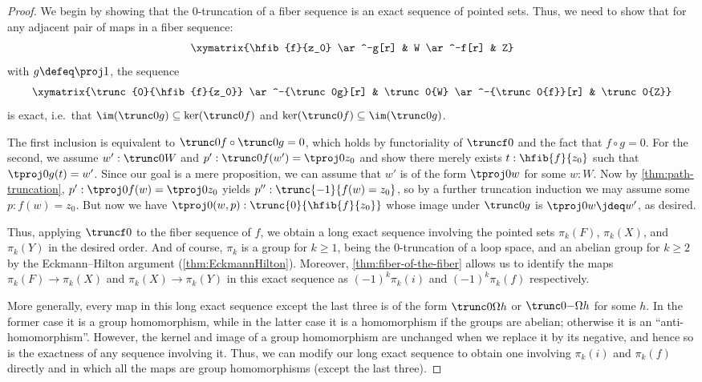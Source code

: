 \begin{proof}
  We begin by showing that the 0-truncation of a fiber sequence is an exact sequence of pointed sets.
  Thus, we need to show that for any adjacent pair of maps in a fiber sequence:
  \[\xymatrix{\hfib{f}{z_0} \ar^-g[r] & W \ar^-f[r] & Z}\]
  with $g\defeq \proj1$, the sequence
  \[\xymatrix{\trunc{0}{\hfib{f}{z_0}} \ar^-{\trunc0g}[r] & \trunc0{W}
    \ar^-{\trunc0{f}}[r] & \trunc0{Z}}\]
  is exact, i.e.\ that $\im(\trunc0g)\subseteq\ker(\trunc0f)$ and $\ker(\trunc0f)\subseteq\im(\trunc0g)$.

  The first inclusion is equivalent to $\trunc0f\circ\trunc0g=0$, which holds by functoriality of $\truncf0$ and the fact that $f\circ g=0$.
  For the second, we assume $w':\trunc0W$ and $p':\trunc0f(w')=\tproj0{z_0}$ and show there merely exists ${t:\hfib{f}{z_0}}$ such that $\tproj0{g(t)}=w'$.
  Since our goal is a mere proposition, we can assume that $w'$ is of the
  form $\tproj0w$ for some $w:W$.
  Now by \cref{thm:path-truncation}, $p' : \tproj0{f(w)}=\tproj0{z_0}$ yields $p'': \trunc{-1}{f(w)=z_0}$, so by a further truncation induction we may assume some $p:f(w)=z_0$.
  But now we have $\tproj0{(w,p)}:\trunc{0}{\hfib{f}{z_0}}$ whose image under $\trunc0g$ is $\tproj0w\jdeq w'$, as desired.

  Thus, applying $\truncf0$ to the fiber sequence of $f$, we obtain a long exact sequence involving the pointed sets $\pi_k(F)$, $\pi_k(X)$, and $\pi_k(Y)$ in the desired order.
  And of course, $\pi_k$ is a group for $k\ge1$, being the 0-truncation of a loop space, and an abelian group for $k\ge 2$ by the Eckmann--Hilton argument
   (\cref{thm:EckmannHilton}).
  Moreover, \cref{thm:fiber-of-the-fiber} allows us to identify the maps $\pi_k(F) \to \pi_k(X)$ and $\pi_k(X) \to \pi_k(Y)$ in this exact sequence as $(-1)^k \pi_k(i)$ and $(-1)^k \pi_k(f)$ respectively.

  More generally, every map in this long exact sequence except the last three is of the form $\trunc0{\Omega h}$ or $\trunc0{-\Omega h}$ for some $h$.
  In the former case it is a group homomorphism, while in the latter case it is a homomorphism if the groups are abelian; otherwise it is an ``anti-homomorphism''.
  However, the kernel and image of a group homomorphism are unchanged when we replace it by its negative, and hence so is the exactness of any sequence involving it.
  Thus, we can modify our long exact sequence to obtain one involving $\pi_k(i)$ and $\pi_k(f)$ directly and in which all the maps are group homomorphisms (except the last three).
\end{proof}

